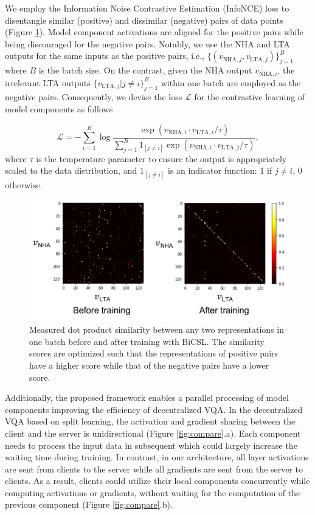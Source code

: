 \documentclass[letterpaper]{article} %
\begin{document}
We employ the Information Noise Contrastive Estimation (InfoNCE) loss \cite{infonce} to disentangle similar (positive) and dissimilar (negative) pairs of data points (Figure \ref{fig:heat}). Model component activations are aligned for the positive pairs while being discouraged for the negative pairs. Notably, we use the NHA and LTA outputs for the same inputs as the positive pairs, i.e., $\{(v_{\text{NHA},j},v_{\text{LTA},j})\}_{j=1}^B$ where $B$ is the batch size. On the contrast, given the NHA output $v_{\text{NHA},i}$, the irrelevant LTA outputs $\{v_{\text{LTA},j}|j\neq i\}_{j=1}^B$ within one batch are employed as the negative pairs. Consequently, we devise the loss $\mathcal{L}$ for the contrastive learning of model components as follows

\begin{equation}
        \mathcal{L}= -\sum_{i=1}^{B}\log\frac{\exp(v_{\text{NHA},i} \cdot v_{\text{LTA},i} / \tau)}{\sum_{j=1}^{B} {1}_{[j \neq i]} \exp(v_{\text{NHA},i} \cdot v_{\text{LTA},j} / \tau)},
\end{equation}
where $\tau$ is the temperature parameter to ensure the output is appropriately scaled to the data distribution, and ${1}_{[j \neq i]}$ is an indicator function: 1 if $j \neq i$, 0 otherwise.

\begin{figure}[!t]
\centering
    \includegraphics[width=\linewidth]{figures/heat.pdf}
    \caption{Measured dot product similarity between any two representations in one batch before and after training with BiCSL. The similarity scores are optimized such that the representations of positive pairs have a higher score while that of the negative pairs have a lower score.}
    \label{fig:heat}
\end{figure}

Additionally, the proposed framework enables a parallel processing of model components improving the efficiency of decentralized VQA. In the decentralized VQA based on split learning, the activation and gradient sharing between the client and the server is unidirectional (Figure \ref{fig:compare}.a). Each component needs to process the input data in subsequent which could largely increase the waiting time during training. In contrast, in our architecture, all layer activations are sent from clients to the server while all gradients are sent from the server to clients. As a result, clients could utilize their local components concurrently while computing activations or gradients, without waiting for the computation of the previous component (Figure \ref{fig:compare}.b).
\end{document}
